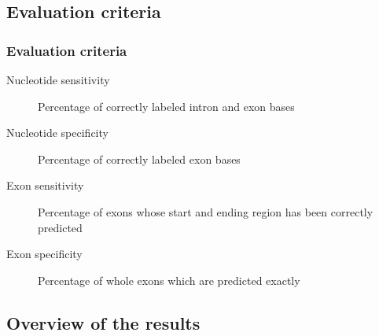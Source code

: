 \documentclass{beamer}[12pt]
\begin{document}
\subsection{Evaluation criteria}
\begin{frame}
\frametitle{Evaluation criteria}
	\begin{description}
		\item[Nucleotide sensitivity] Percentage of correctly labeled intron and exon bases
		\item[Nucleotide specificity] Percentage of correctly labeled exon bases
		\item[Exon sensitivity] Percentage of exons whose start and ending region has been correctly predicted
		\item[Exon specificity] Percentage of whole exons which are predicted exactly
	\end{description}
\end{frame}

\subsection{Overview of the results}
\end{document}
